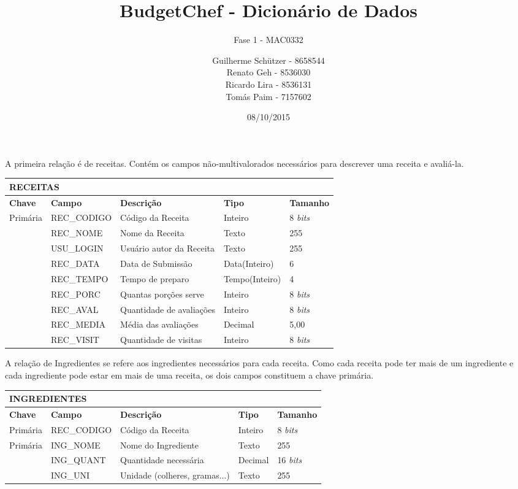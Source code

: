 \documentclass[a4paper]{article}
\title{\textbf{BudgetChef - Dicionário de Dados}}
\subtitle{Fase 1 - MAC0332}
\author{
	Guilherme Schützer - 8658544\\
	Renato Geh - 8536030\\
	Ricardo Lira - 8536131\\
	Tomás Paim - 7157602\\
}
\date{08/10/2015}
\begin{document}
\maketitle

A primeira relação é de receitas. Contém os campos não-multivalorados necessários para descrever uma receita e avaliá-la.

\begin{center}
\begin{tabular}{ l | l || l | l l }
  \multicolumn{5}{l}{\textbf{RECEITAS}} \\
  \hline
  \textbf{Chave} & \textbf{Campo} & \textbf{Descrição} & \textbf{Tipo} & \textbf{Tamanho} \\
  \cline{1-5}
  Primária & REC\_CODIGO & Código da Receita & Inteiro & 8 \emph{bits}  \\
   & REC\_NOME & Nome da Receita & Texto & 255 \\
   & USU\_LOGIN & Usuário autor da Receita & Texto & 255 \\
   & REC\_DATA & Data de Submissão & Data(Inteiro) & 6 \\
   & REC\_TEMPO & Tempo de preparo & Tempo(Inteiro) & 4 \\
   & REC\_PORC & Quantas porções serve & Inteiro & 8 \emph{bits} \\
   & REC\_AVAL & Quantidade de avaliações & Inteiro & 8 \emph{bits} \\
   & REC\_MEDIA & Média das avaliações & Decimal & 5,00 \\
   & REC\_VISIT & Quantidade de visitas & Inteiro & 8 \emph{bits}
\end{tabular}
\end{center}

A relação de Ingredientes se refere aos ingredientes necessários para cada receita. Como cada receita pode ter mais de um ingrediente e cada ingrediente pode estar em mais de uma receita, os dois campos constituem a chave primária.

\begin{center}
\begin{tabular}{ l | l || l | l l }
  \multicolumn{5}{l}{\textbf{INGREDIENTES}} \\
  \hline
  \textbf{Chave} & \textbf{Campo} & \textbf{Descrição} & \textbf{Tipo} & \textbf{Tamanho} \\
  \cline{1-5}
  Primária & REC\_CODIGO & Código da Receita & Inteiro & 8 \emph{bits}  \\
  Primária & ING\_NOME & Nome do Ingrediente & Texto & 255 \\
   & ING\_QUANT & Quantidade necessária & Decimal & 16 \emph{bits} \\
   & ING\_UNI & Unidade (colheres, gramas...) & Texto & 255
\end{tabular}
\end{center}
\end{document}
